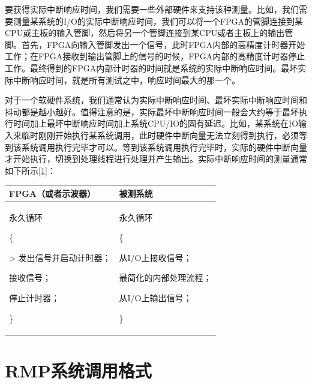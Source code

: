 要获得实际中断响应时间，我们需要一些外部硬件来支持该种测量。比如，我们需要测量某系统的I/O的实际中断响应时间，我们可以将一个FPGA的管脚连接到某CPU或主板的输入管脚，然后将另一个管脚连接到某CPU或者主板上的输出管脚。首先，FPGA向输入管脚发出一个信号，此时FPGA内部的高精度计时器开始工作；在FPGA接收到输出管脚上的信号的时候，FPGA内部的高精度计时器停止工作。最终得到的FPGA内部计时器的时间就是系统的实际中断响应时间。最坏实际中断响应时间，就是所有测试之中，响应时间最大的那一个。

对于一个软硬件系统，我们通常认为实际中断响应时间、最坏实际中断响应时间和抖动都是越小越好。值得注意的是，实际最坏中断响应时间一般会大约等于最坏执行时间加上最坏中断响应时间加上系统CPU/IO的固有延迟。比如，某系统在IO输入来临时刚刚开始执行某系统调用，此时硬件中断向量无法立刻得到执行，必须等到该系统调用执行完毕才可以。等到该系统调用执行完毕时，实际的硬件中断向量才开始执行，切换到处理线程进行处理并产生输出。实际中断响应时间的测量通常如下所示\hyperref[sec:chapter-bibliography-2]{{[}1{]}}：

\label{tab:realistic-interrupt-response-time}

{\def\LTcaptype{none} %
\begin{longtable}[]{@{}
  >{\raggedright\arraybackslash}p{}
  >{\raggedright\arraybackslash}p{}@{}}
\toprule\noalign{}
\begin{minipage}[b]{\linewidth}\raggedright
FPGA（或者示波器）
\end{minipage} & \begin{minipage}[b]{\linewidth}\raggedright
被测系统
\end{minipage} \\
\midrule\noalign{}
\endhead
\bottomrule\noalign{}
\endlastfoot
永久循环

\{

\textgreater{} 发出信号并启动计时器；

接收信号；

停止计时器；

\} & 永久循环

\{

从I/O上接收信号；

最简化的内部处理流程；

从I/O上输出信号；

\} \\
\end{longtable}
}

\section{RMP系统调用格式}\label{sec:rmp-system-call-format}

